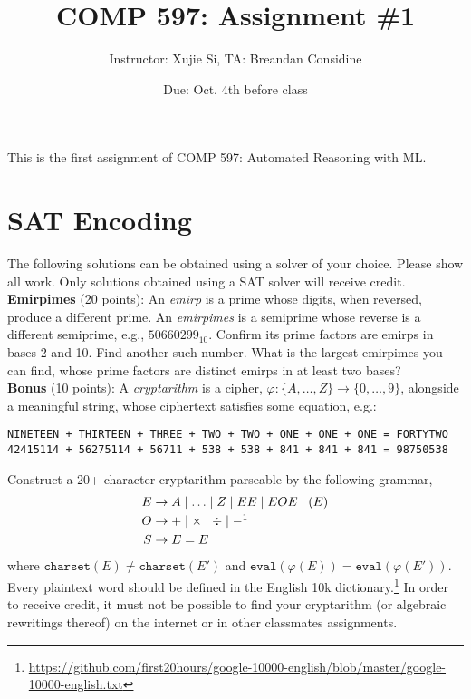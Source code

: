 \documentclass[11pt]{article}
\author{Instructor: Xujie Si, TA: Breandan Considine}
\date{Due: Oct. 4th before class}
\title{COMP 597: Assignment \#1}
\begin{document}
    \maketitle
    \noindent This is the first assignment of COMP 597: Automated Reasoning with ML.


    \section{SAT Encoding}

    The following solutions can be obtained using a solver of your choice. Please show all work. Only solutions obtained using a SAT solver will receive credit.\\

    \noindent \textbf{Emirpimes} (20 points): An \textit{emirp} is a prime whose digits, when reversed, produce a different prime. An \textit{emirpimes} is a semiprime whose reverse is a different semiprime, e.g., $50660299_{10}$. Confirm its prime factors are emirps in bases 2 and 10. Find another such number. What is the largest emirpimes you can find, whose prime factors are distinct emirps in at least two bases?\\

    \noindent \textbf{Bonus} (10 points): A \textit{cryptarithm} is a cipher, $\varphi: \{A,\ldots, Z\}\rightarrow \{0, \ldots, 9\}$, alongside a meaningful string, whose ciphertext satisfies some equation, e.g.:

    \begin{lstlisting}[basicstyle=\scriptsize\ttfamily]
NINETEEN + THIRTEEN + THREE + TWO + TWO + ONE + ONE + ONE = FORTYTWO
42415114 + 56275114 + 56711 + 538 + 538 + 841 + 841 + 841 = 98750538
    \end{lstlisting}

    \noindent Construct a 20+-character cryptarithm parseable by the following grammar,
    \begin{align*}
E &\rightarrow A \mid \ldots \mid Z \mid EE \mid E O E \mid ( E )\\
O &\rightarrow + \mid \times \mid \div \mid -\footnotemark\\
S &\rightarrow E = E
    \end{align*}
    \noindent where $\texttt{charset}(E) \neq \texttt{charset}(E')$ and $\texttt{eval}(\varphi(E)) = \texttt{eval}(\varphi(E'))$. Every plaintext word should be defined in the English 10k dictionary.\footnote{\tiny\url{https://github.com/first20hours/google-10000-english/blob/master/google-10000-english.txt}} In order to receive credit, it must not be possible to find your cryptarithm (or algebraic rewritings thereof) on the internet or in other classmates assignments.\\
\end{document}
